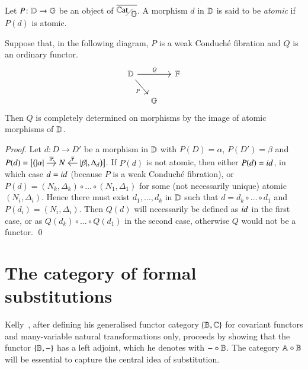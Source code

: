 \begin{definition}
    Let $P \colon \mathbb D \to \mathbb G$ be an object of $\WCFover\gcf$. A morphism $d$ in $\mathbb D$ is said to be \emph{atomic} if $P(d)$ is atomic.
\end{definition}

\begin{lemma}\label{lemma:functors determined by atoms in WCF over E}
    Suppose that, in the following diagram, $P$ is a weak Conduché fibration and $Q$ is an ordinary functor.
    \[
    \begin{tikzcd}[column sep={1cm,between origins}]
    \D \ar[rr,"Q"] \ar[dr,"P"'] & & \mathbb F  \\
    & \gcf
    \end{tikzcd}
    \]
    Then $Q$ is completely determined on morphisms by the image of atomic morphisms of $\mathbb D$.
\end{lemma}
\begin{proof}
    Let $d \colon D \to D'$ be a morphism in $\mathbb D$ with $P(D)=\alpha$, $P(D')=\beta$ and $P(d) = \bigl[ \bigl(
    \begin{tikzcd}[cramped,sep=small]
    \length\alpha \ar[r,"\overline\sigma"] & N & \length\beta \ar[l,"\overline\tau"']
    \end{tikzcd}, \Delta_d \bigr) \bigr]
    $. If $P(d)$ is not atomic, then either $P(d)=\mathop{\textit{id}_{}}$, in which case $d=\mathop{\textit{id}_{}}$ (because $P$ is a weak Conduché fibration), or $P(d)=(N_k,\Delta_k) \circ \dots \circ (N_1,\Delta_1)$ for some (not necessarily unique) atomic $(N_i,\Delta_i)$. Hence there must exist $d_1,\dots,d_k$ in $\mathbb D$ such that $d=d_k \circ \dots \circ d_1$ and $P(d_i)=(N_i,\Delta_i)$. Then $Q(d)$ will necessarily be defined as $\mathop{\textit{id}_{}}$ in the first case, or as $Q(d_k) \circ \dots \circ Q(d_1)$ in the second case, otherwise $Q$ would not be a functor. \qed
\end{proof}

\section{The category of formal substitutions}\label{section:category of formal substitutions}

Kelly~\cite{kelly_many-variable_1972}, after defining his generalised functor category $\{ \mathbb B,\mathbb C\}$ for covariant functors and many-variable natural transformations only, 
proceeds by showing that the functor $\{ \mathbb B,-\}$
has a left adjoint, which he denotes with $- \circ \mathbb B$. The category $\mathbb A \circ \mathbb B$ will be essential to capture the central idea of substitution. 

